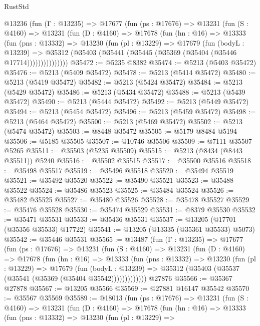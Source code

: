 \begin{lexlean}{RustStd}
\begin{coremodule}
    @13236
      (fun (Γ : @13235) =>
      @17677
        (fun (ps : @17676) =>
        @13231
          (fun (S : @4160) =>
          @13231
            (fun (D : @4160) =>
            @17678
              (fun (hn : @16) =>
              @13333
                (fun (pns : @13332) =>
                @13230
                  (fun (pl : @13229) =>
                  @17679
                    (fun (bodyL : @13239) =>
                    @35312 (@35403 (@35441 (@35445 (@35369 (@35404 (@35446 @17714)))))))))))))))
@35472 := @5235 @8382
@35474 := @5213 (@5403 @35472)
@35476 := @5213 (@5409 @35472)
@35478 := @5213 (@5414 @35472)
@35480 := @5213 (@5419 @35472)
@35482 := @5213 (@5424 @35472)
@35484 := @5213 (@5429 @35472)
@35486 := @5213 (@5434 @35472)
@35488 := @5213 (@5439 @35472)
@35490 := @5213 (@5444 @35472)
@35492 := @5213 (@5449 @35472)
@35494 := @5213 (@5454 @35472)
@35496 := @5213 (@5459 @35472)
@35498 := @5213 (@5464 @35472)
@35500 := @5213 (@5469 @35472)
@35502 := @5213 (@5474 @35472)
@35503 := @8448 @35472
@35505 := @5179 @8484 @5194
@35506 := @5185 @35505
@35507 := @10746 @35506
@35509 := @7111 @35507 @5265
@35511 := @35503 (@5235 @35509)
@35515 := @5213 (@8434 (@8443 @35511)) @5240
@35516 := @35502 @35515
@35517 := @35500 @35516
@35518 := @35498 @35517
@35519 := @35496 @35518
@35520 := @35494 @35519
@35521 := @35492 @35520
@35522 := @35490 @35521
@35523 := @35488 @35522
@35524 := @35486 @35523
@35525 := @35484 @35524
@35526 := @35482 @35525
@35527 := @35480 @35526
@35528 := @35478 @35527
@35529 := @35476 @35528
@35530 := @35474 @35529
@35531 := @8379 @35530
@35532 := @35471 @35531
@35533 := @35436 @35531
@35537 := @13205 (@17701 (@35356 @35533) @17722)
@35541 := @13205 (@13335 (@35361 @35533) @5073)
@35542 := @35446 @35531
@35565 := @13487
    (fun (Γ : @13235) =>
    @17677
      (fun (ps : @17676) =>
      @13231
        (fun (S : @4160) =>
        @13231
          (fun (D : @4160) =>
          @17678
            (fun (hn : @16) =>
            @13333
              (fun (pns : @13332) =>
              @13230
                (fun (pl : @13229) =>
                @17679
                  (fun (bodyL : @13239) =>
                  @35312 (@35403 (@35537 (@35541 (@35369 (@35404 @35542)))))))))))))
    @27876
@35566 := @35367 @27878
@35567 := @13205 @35566
@35569 := @27881 @16147 @35542
@35570 := @35567 @35569
@35589 := @18013
    (fun (ps : @17676) =>
    @13231
      (fun (S : @4160) =>
      @13231
        (fun (D : @4160) =>
        @17678
          (fun (hn : @16) =>
          @13333
            (fun (pns : @13332) =>
            @13230
              (fun (pl : @13229) =>

\end{coremodule}
\end{lexlean}
